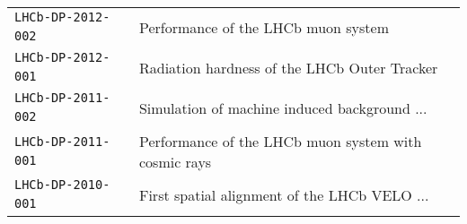 \begin{center}
\begin{tabular}{ll}
    \texttt{LHCb-DP-2012-002}~\cite{LHCb-DP-2012-002} &
    {\small Performance of the LHCb muon system} \\
    \texttt{LHCb-DP-2012-001}~\cite{LHCb-DP-2012-001} &
    {\small Radiation hardness of the LHCb Outer Tracker} \\
    \texttt{LHCb-DP-2011-002}~\cite{LHCb-DP-2011-002} &
    {\small Simulation of machine induced background ...} \\
    \texttt{LHCb-DP-2011-001}~\cite{LHCb-DP-2011-001} &
    {\small Performance of the LHCb muon system with cosmic rays} \\
    \texttt{LHCb-DP-2010-001}~\cite{LHCb-DP-2010-001} &
    {\small First spatial alignment of the LHCb VELO ...} \\
    \hline
  \end{tabular}
\end{center}


